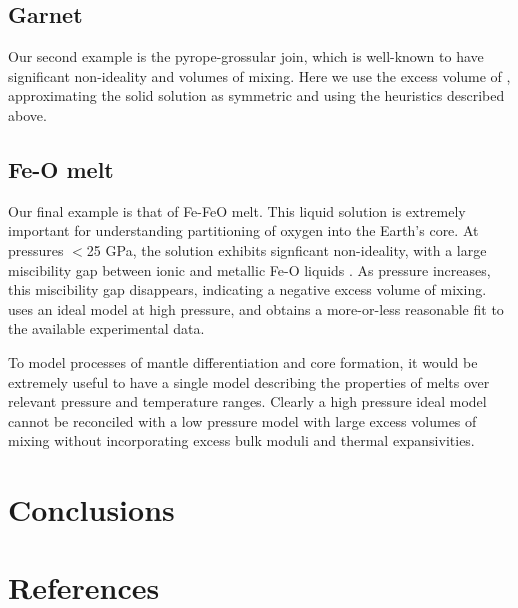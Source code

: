 \documentclass[review]{elsarticle}
\begin{document}
\subsection{Garnet}
Our second example is the pyrope-grossular join, which is well-known to have significant non-ideality and volumes of mixing. Here we use the excess volume of \cite{DCW2015}, approximating the solid solution as symmetric and using the heuristics described above.


\subsection{Fe-O melt}

Our final example is that of Fe-FeO melt. This liquid solution is extremely important for understanding partitioning of oxygen into the Earth's core. At pressures $<$25 GPa, the solution exhibits signficant non-ideality, with a large miscibility gap between ionic and metallic Fe-O liquids \citep{Frostetal2010}. As pressure increases, this miscibility gap disappears, indicating a negative excess volume of mixing. \cite{Kom2014} uses an ideal model at high pressure, and obtains a more-or-less reasonable fit to the available experimental data. 

To model processes of mantle differentiation and core formation, it would be extremely useful to have a single model describing the properties of melts over relevant pressure and temperature ranges. Clearly a high pressure ideal model cannot be reconciled with a low pressure model with large excess volumes of mixing without incorporating excess bulk moduli and thermal expansivities. 

\cite{DKS2013}

\section{Conclusions}



\clearpage
\section*{References}


\end{document}
